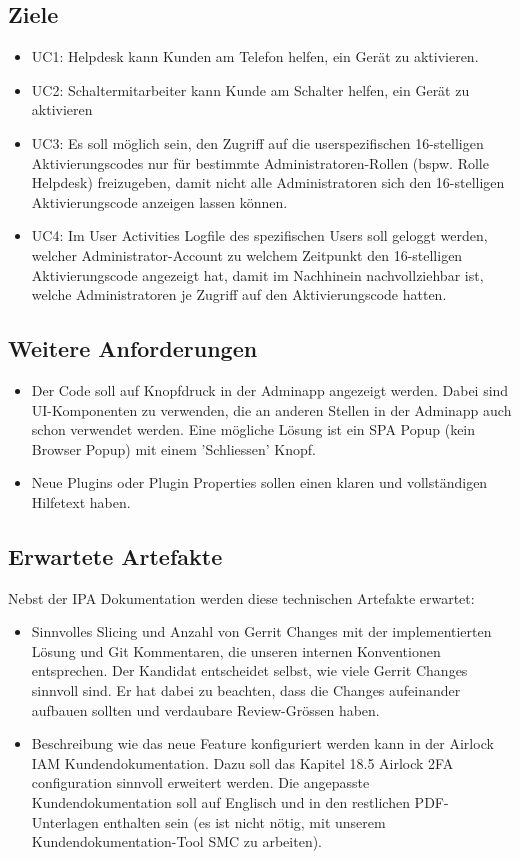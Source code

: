 \subsection*{Ziele}
\begin{itemize}
	\item UC1: Helpdesk kann Kunden am Telefon helfen, ein Gerät zu aktivieren.
	\item UC2: Schaltermitarbeiter kann Kunde am Schalter helfen, ein Gerät zu aktivieren
	\item UC3: Es soll möglich sein, den Zugriff auf die userspezifischen 16-stelligen Aktivierungscodes nur für bestimmte Administratoren-Rollen (bspw. Rolle Helpdesk) freizugeben, damit nicht alle Administratoren sich den 16-stelligen Aktivierungscode anzeigen lassen können.
	\item UC4: Im User Activities Logfile des spezifischen Users soll geloggt werden, welcher Administrator-Account zu welchem Zeitpunkt den 16-stelligen Aktivierungscode angezeigt hat, damit im Nachhinein nachvollziehbar ist, welche Administratoren je Zugriff auf den Aktivierungscode hatten.
\end{itemize}

\subsection*{Weitere Anforderungen}
\begin{itemize}
	\item Der Code soll auf Knopfdruck in der Adminapp angezeigt werden. Dabei sind UI-Komponenten zu verwenden, die an anderen Stellen in der Adminapp auch schon verwendet werden. Eine mögliche Lösung ist ein SPA Popup (kein Browser Popup) mit einem 'Schliessen' Knopf.
	\item Neue Plugins oder Plugin Properties sollen einen klaren und vollständigen Hilfetext haben.
\end{itemize}

\subsection*{Erwartete Artefakte}
Nebst der IPA Dokumentation werden diese technischen Artefakte erwartet:
\begin{itemize}
	\item Sinnvolles Slicing und Anzahl von Gerrit Changes mit der implementierten Lösung und Git Kommentaren, die unseren internen Konventionen entsprechen. Der Kandidat entscheidet selbst, wie viele Gerrit Changes sinnvoll sind. Er hat dabei zu beachten, dass die Changes aufeinander aufbauen sollten und \flqq verdaubare\frqq{} Review-Grössen haben.
	\item Beschreibung wie das neue Feature konfiguriert werden kann in der Airlock IAM Kundendokumentation. Dazu soll das Kapitel 18.5 Airlock 2FA configuration sinnvoll erweitert werden. Die angepasste Kundendokumentation soll auf Englisch und in den restlichen PDF-Unterlagen enthalten sein (es ist nicht nötig, mit unserem Kundendokumentation-Tool SMC zu arbeiten).
\end{itemize}

